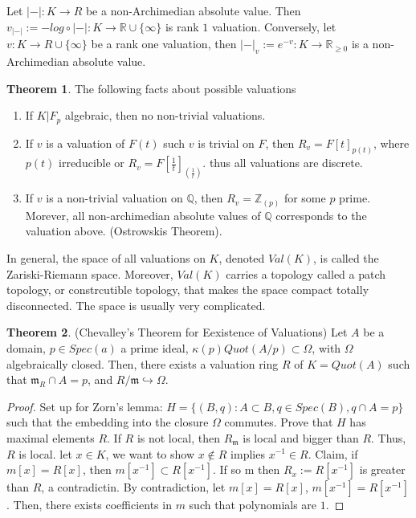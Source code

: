 \documentclass{article}
\theoremstyle{definition}
\newtheorem{theorem}{Theorem}[section]
\theoremstyle{definition}
\theoremstyle{definition}
\theoremstyle{definition}
\theoremstyle{definition}
\theoremstyle{definition}
\theoremstyle{definition}
\begin{document}
Let $|-|: K\to R$ be a non-Archimedian absolute value. Then $v_{|-|}:=- log\circ |-|:K\to \mathbb{R}\cup \{\infty\} $ is rank $1$ valuation. Conversely, let $v: K\to R\cup \{\infty\}$ be a rank one valuation, then $|-|_{v}:=e^{-v}: K\to \mathbb{R}_{\geq 0}$ is a non-Archimedian absolute value. 


\begin{tcolorbox}[colback=red!5!white,colframe=red!30!white]
\begin{theorem}
    The following facts about possible valuations
\begin{enumerate}
    \item If $K|F_p$ algebraic, then no non-trivial valuations.
    \item If $v$ is a valuation of $F(t)$ such $v$ is trivial on $F$, then $R_v=F[t]_{p(t)}$, where $p(t)$ irreducible or $R_v=F[\frac{1}{t}]_{(\frac{1}{t})}$. thus all valuations are discrete. 
    \item If $v$ is a non-trivial valuation on $\mathbb{Q}$, then $R_v=\mathbb{Z}_{(p)}$ for some $p$ prime. Morever, all non-archimedian absolute values of $\mathbb{Q}$ corresponds to the valuation above. (Ostrowskis Theorem).
\end{enumerate}
\end{theorem}
\end{tcolorbox}
In general, the space of all valuations on $K$, denoted $Val(K)$, is called the Zariski-Riemann space. Moreover, $Val(K)$ carries a topology called a patch topology, or constrcutible topology, that makes the space compact totally disconnected. The space is usually very complicated.


\begin{tcolorbox}[colback=red!5!white,colframe=red!30!white]
\begin{theorem}
(Chevalley's Theorem for Eexistence of Valuations) Let $A$ be a domain, $p\in Spec(a)$ a prime ideal, $\kappa(p)Quot(A/p)\subset \Omega$, with $\Omega$ algebraically closed. Then, there exists a valuation ring $R$ of $K=Quot(A)$ such that $\mathfrak{m}_R\cap A=p$, and $R/\mathfrak{m}\hookrightarrow \Omega$.
\end{theorem}
\end{tcolorbox}
\begin{proof}
    Set up for Zorn's lemma: $H=\{ (B,q): A\subset B, q\in Spec(B), q\cap A=p \}$ such that the embedding into the closure $\Omega$ commutes. Prove that $H$ has maximal elements $R$. If $R$ is not local, then $R_{\mathfrak{m}}$ is local and bigger than $R$. Thus, $R$ is local. let $x\in K$, we want to show $x\not \in R$ implies $x^{-1}\in R$. Claim, if $m[x]=R[x]$, then $m[x^{-1}]\subset R[x^{-1}]$. If so m then $R_x:=R[x^{-1}]$ is greater than $R$, a contradictin. By contradiction, let $m[x]=R[x]$, $m[x^{-1}]=R[x^{-1}]$. Then, there exists coefficients in $m$ such that polynomials are $1$.  
\end{proof}
\end{document}
